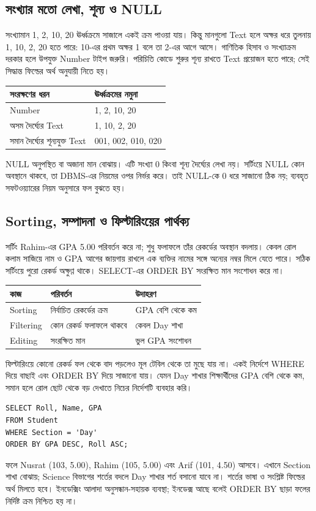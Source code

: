 \subsection{সংখ্যার মতো লেখা, শূন্য ও NULL}
সংখ্যামান 1, 2, 10, 20 ঊর্ধ্বক্রমে সাজালে একই ক্রম পাওয়া যায়। কিন্তু মানগুলো Text হলে অক্ষর ধরে তুলনায় 1, 10, 2, 20 হতে পারে: 10-এর প্রথম অক্ষর 1 বলে তা 2-এর আগে আসে। গাণিতিক হিসাব ও সংখ্যাক্রম দরকার হলে উপযুক্ত Number টাইপ জরুরি। পরিচিতি কোডে শুরুর শূন্য রাখতে Text প্রয়োজন হতে পারে; সেই সিদ্ধান্ত ফিল্ডের অর্থ অনুযায়ী নিতে হয়।
\begin{flushleft}\small
\begin{tabular}{|l|l|}\hline
সংরক্ষণের ধরন & ঊর্ধ্বক্রমের নমুনা\\\hline
Number & 1, 2, 10, 20\\\hline
অসম দৈর্ঘ্যের Text & 1, 10, 2, 20\\\hline
সমান দৈর্ঘ্যের শূন্যযুক্ত Text & 001, 002, 010, 020\\\hline
\end{tabular}
\end{flushleft}
NULL অনুপস্থিত বা অজানা মান বোঝায়। এটি সংখ্যা 0 কিংবা শূন্য দৈর্ঘ্যের লেখা \texttt{\textquotesingle\textquotesingle} নয়। সর্টিংয়ে NULL কোন অবস্থানে থাকবে, তা DBMS-এর নিয়মের ওপর নির্ভর করে। তাই NULL-কে 0 ধরে সাজানো ঠিক নয়; ব্যবহৃত সফটওয়্যারের নিয়ম অনুসারে ফল বুঝতে হয়।

\subsection{Sorting, সম্পাদনা ও ফিল্টারিংয়ের পার্থক্য}
সর্টিং Rahim-এর GPA 5.00 পরিবর্তন করে না; শুধু ফলাফলে তাঁর রেকর্ডের অবস্থান বদলায়। কেবল রোল কলাম সাজিয়ে নাম ও GPA আগের জায়গায় রাখলে এক ব্যক্তির নামের সঙ্গে অন্যের নম্বর মিলে যেতে পারে। সঠিক সর্টিংয়ে পুরো রেকর্ড অক্ষুণ্ণ থাকে। SELECT-এর ORDER BY সংরক্ষিত মান সংশোধন করে না।
\begin{flushleft}\small
\begin{tabularx}{\linewidth}{|p{23mm}|X|X|}\hline
কাজ & পরিবর্তন & উদাহরণ\\\hline
Sorting & নির্বাচিত রেকর্ডের ক্রম & GPA বেশি থেকে কম\\\hline
Filtering & কোন রেকর্ড ফলাফলে থাকবে & কেবল Day শাখা\\\hline
Editing & সংরক্ষিত মান & ভুল GPA সংশোধন\\\hline
\end{tabularx}
\end{flushleft}
ফিল্টারিংয়ে কোনো রেকর্ড ফল থেকে বাদ পড়লেও মূল টেবিল থেকে তা মুছে যায় না। একই নির্দেশে WHERE দিয়ে বাছাই এবং ORDER BY দিয়ে সাজানো যায়। যেমন Day শাখার শিক্ষার্থীদের GPA বেশি থেকে কম, সমান হলে রোল ছোট থেকে বড় দেখাতে নিচের নির্দেশটি ব্যবহার করি।
\begin{verbatim}
SELECT Roll, Name, GPA
FROM Student
WHERE Section = 'Day'
ORDER BY GPA DESC, Roll ASC;
\end{verbatim}
ফলে Nusrat (103, 5.00), Rahim (105, 5.00) এবং Arif (101, 4.50) আসবে। এখানে Section শাখা বোঝায়; Science বিভাগের শর্তের বদলে Day শাখার শর্ত বসানো যাবে না। শর্তের ভাষা ও সংশ্লিষ্ট ফিল্ডের অর্থ মিলতে হবে। ইনডেক্সিং আলাদা অনুসন্ধান-সহায়ক ব্যবস্থা; ইনডেক্স আছে বলেই ORDER BY ছাড়া ফলের নির্দিষ্ট ক্রম নিশ্চিত হয় না।

